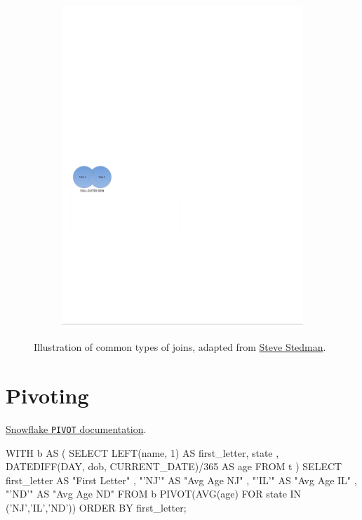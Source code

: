 \begin{figure}[H]
\begin{subfigure}[c]{0.3\textwidth}
  \includegraphics[width=\textwidth]{figures/sql/full_outer_join}
  \label{fig:sql:joins:full_outer_join}
  \end{subfigure}
\caption{
Illustration of common types of joins,
adapted from \href{http://stevestedman.com/2015/03/sql-server-join-types-poster-version-2}{Steve Stedman}.
}
\label{fig:sql:joins}
\end{figure}

\section{Pivoting}
\label{ssql:pivoting}

\noindent \href{https://docs.snowflake.com/en/sql-reference/constructs/pivot.html}{Snowflake \texttt{PIVOT} documentation}.

\begin{SQLcode}
WITH b AS (
	SELECT LEFT(name, 1) AS first_letter, state
		, DATEDIFF(DAY, dob, CURRENT_DATE)/365 AS age
	FROM t
)
SELECT first_letter AS "First Letter"
	, "'NJ'" AS "Avg Age NJ"
	, "'IL'" AS "Avg Age IL"
	, "'ND'" AS "Avg Age ND"
FROM b
PIVOT(AVG(age) FOR state IN ('NJ','IL','ND'))
ORDER BY first_letter;
\end{SQLcode}

